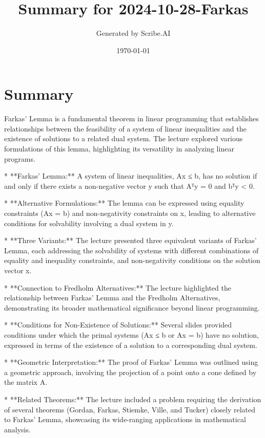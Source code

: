 \documentclass{article}%
\title{Summary for 2024{-}10{-}28{-}Farkas}%
\author{Generated by Scribe.AI}%
\date{\today}%
\begin{document}
%
\normalsize%
\maketitle%
\section{Summary}%
\label{sec:Summary}%
Farkas' Lemma is a fundamental theorem in linear programming that establishes relationships between the feasibility of a system of linear inequalities and the existence of solutions to a related dual system.  The lecture explored various formulations of this lemma, highlighting its versatility in analyzing linear programs.

*   **Farkas' Lemma:** A system of linear inequalities, Ax ≤ b, has no solution if and only if there exists a non-negative vector y such that Aᵀy = 0 and bᵀy < 0.

*   **Alternative Formulations:**  The lemma can be expressed using equality constraints (Ax = b) and non-negativity constraints on x, leading to alternative conditions for solvability involving a dual system in y.

*   **Three Variants:**  The lecture presented three equivalent variants of Farkas' Lemma, each addressing the solvability of systems with different combinations of equality and inequality constraints, and non-negativity conditions on the solution vector x.

*   **Connection to Fredholm Alternatives:** The lecture highlighted the relationship between Farkas' Lemma and the Fredholm Alternatives, demonstrating its broader mathematical significance beyond linear programming.

*   **Conditions for Non-Existence of Solutions:**  Several slides provided conditions under which the primal systems (Ax ≤ b or Ax = b) have no solution, expressed in terms of the existence of a solution to a corresponding dual system.

*   **Geometric Interpretation:** The proof of Farkas' Lemma was outlined using a geometric approach, involving the projection of a point onto a cone defined by the matrix A.

*   **Related Theorems:** The lecture included a problem requiring the derivation of several theorems (Gordan, Farkas, Stiemke, Ville, and Tucker) closely related to Farkas' Lemma, showcasing its wide-ranging applications in mathematical analysis.

%
\end{document}

